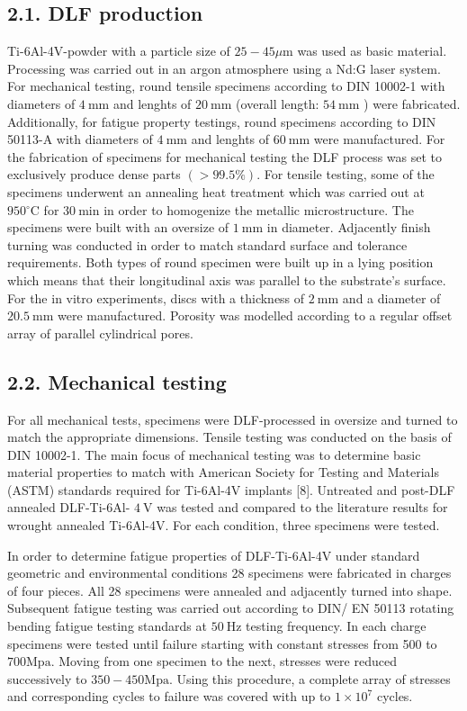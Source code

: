 \documentclass[10pt]{article}
\begin{document}
\subsection*{2.1. DLF production}
Ti-6Al-4V-powder with a particle size of $25-45 \mu \mathrm{m}$ was used as basic material. Processing was carried out in an argon atmosphere using a Nd:G laser system. For mechanical testing, round tensile specimens according to DIN 10002-1 with diameters of $4 \mathrm{~mm}$ and lenghts of $20 \mathrm{~mm}$ (overall length: $54 \mathrm{~mm}$ ) were fabricated. Additionally, for fatigue property testings, round specimens according to DIN 50113-A with diameters of $4 \mathrm{~mm}$ and lenghts of $60 \mathrm{~mm}$ were manufactured. For the fabrication of specimens for mechanical testing the DLF process was set to exclusively produce dense parts $(>99.5 \%)$. For tensile testing, some of the specimens underwent an annealing heat treatment which was carried out at $950{ }^{\circ} \mathrm{C}$ for $30 \mathrm{~min}$ in order to homogenize the metallic microstructure. The specimens were built with an oversize of $1 \mathrm{~mm}$ in diameter. Adjacently finish turning was conducted in order to match standard surface and tolerance requirements. Both types of round specimen were built up in a lying position which means that their longitudinal axis was parallel to the substrate's surface. For the in vitro experiments, discs with a thickness of $2 \mathrm{~mm}$ and a diameter of $20.5 \mathrm{~mm}$ were manufactured. Porosity was modelled according to a regular offset array of parallel cylindrical pores.

\subsection*{2.2. Mechanical testing}
For all mechanical tests, specimens were DLF-processed in oversize and turned to match the appropriate dimensions. Tensile testing was conducted on the basis of DIN 10002-1. The main focus of mechanical testing was to determine basic material properties to match with American Society for Testing and Materials (ASTM) standards required for Ti-6Al-4V implants [8]. Untreated and post-DLF annealed DLF-Ti-6Al- $4 \mathrm{~V}$ was tested and compared to the literature results for wrought annealed Ti-6Al-4V. For each condition, three specimens were tested.

In order to determine fatigue properties of DLF-Ti-6Al-4V under standard geometric and environmental conditions 28 specimens were fabricated in charges of four pieces. All 28 specimens were annealed and adjacently turned into shape. Subsequent fatigue testing was carried out according to DIN/ EN 50113 rotating bending fatigue testing standards at $50 \mathrm{~Hz}$ testing frequency. In each charge specimens were tested until failure starting with constant stresses from 500 to $700 \mathrm{Mpa}$. Moving from one specimen to the next, stresses were reduced successively to $350-450 \mathrm{Mpa}$. Using this procedure, a complete array of stresses and corresponding cycles to failure was covered with up to $1 \times 10^{7}$ cycles.
\end{document}
